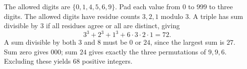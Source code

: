 The allowed digits are $\{0,1,4,5,6,9\}$. Pad each value from $0$ to $999$ to three digits. The allowed digits have residue counts $3,2,1$ modulo $3$. A triple has sum divisible by $3$ if all residues agree or all are distinct, giving
\[
3^3+2^3+1^3+6\cdot3\cdot2\cdot1=72.
\]
A sum divisible by both $3$ and $8$ must be $0$ or $24$, since the largest sum is $27$. Sum zero gives $000$; sum $24$ gives exactly the three permutations of $9,9,6$. Excluding these yields $\boxed{68}$ positive integers.
